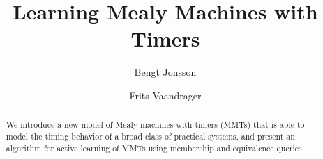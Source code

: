 \documentclass[sigplan,9pt]{acmart}
\newif\ifshort
\begin{document}
\title{Learning Mealy Machines with Timers}
\author{Bengt Jonsson}
\author{Frits Vaandrager}


\ifshort
\vspace{-2em}
\fi
\begin{abstract}
We introduce a new model of Mealy machines with timers (MMTs) that is able to model the timing behavior of a broad class of practical systems, and present an algorithm for active learning of MMTs using membership and equivalence queries. 
\end{abstract}

\maketitle









%





\end{document}
